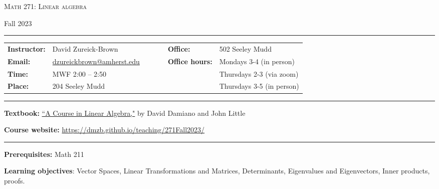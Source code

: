 \documentclass[12pt]{article}
\begin{document}
\begin{center}
{\Large \textsc{Math 271: Linear algebra}}
\end{center}
\begin{center}
Fall 2023
\end{center}



\hrule
\smallskip
\noindent \begin{tabular}{@{}llcccll}
\textbf{Instructor:}     & David Zureick-Brown & & &  & \textbf{Office:} & 502 Seeley Mudd \\
  \textbf{Email:}        &  \href{mailto: dzureickbrown@amherst.edu}{dzureickbrown@amherst.edu} & & & &  \textbf{Office hours:} & Mondays 3-4 (in person)\\
  \textbf{Time:}        &  MWF 2:00 -- 2:50  & & & &  &Thursdays 2-3 (via zoom) \\
  \textbf{Place:}        &  204 Seeley Mudd & & & &  & Thursdays 3-5 (in person)
\end{tabular}
\smallskip
\hrule


\medskip
\noindent\textbf{Textbook:}
\href{https://www.amazon.com/Course-Linear-Algebra-Dover-Mathematics/dp/0486469085}
{``A Course in Linear Algebra,"}  by David Damiano and John Little
\medskip

\noindent\textbf{Course website:} \url{https://dmzb.github.io/teaching/271Fall2023/}
\medskip

\hrule
\medskip

\noindent\textbf{Prerequisites:} Math 211
\medskip


\noindent \textbf{Learning objectives}: Vector Spaces, Linear Transformations and Matrices, Determinants, Eigenvalues and Eigenvectors, Inner products, proofs.

   
\end{document}
